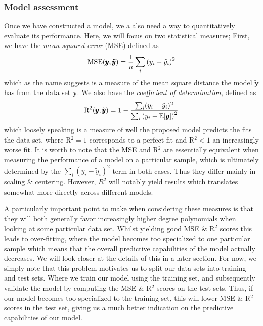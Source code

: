 \documentclass[reprint, english, nofootinbib]{revtex4-2}
\begin{document}
        \subsubsection{Model assessment}
            \noindent
            Once we have constructed a model, we a also need a way to quantitatively evaluate its performance. Here, we will focus on two statistical measures; First, we have the \textit{mean squared error} (MSE) defined as
            \begin{equation}
                \textup{MSE}(\pmb y, \pmb{\tilde y}) = \frac{1}{n}\sum_i \qty(y_i - \tilde y_i)^2
            \end{equation}
            which as the name suggests is a measure of the mean square distance the model $\pmb{\tilde y}$ has from the data set $\pmb y$. We also have the \textit{coefficient of determination}, defined as
            \begin{equation}
                \textup{R}^2(\pmb y, \tilde{\pmb{y}}) = 1 -
                \frac{\sum_i(y_i - \tilde y_i)^2}{\sum_i \qty(y_i - \mathbb E\qty[\pmb y])^2}
            \end{equation}
            which loosely speaking is a measure of well the proposed model predicts the fits the data set, where R$^2 = 1$ corresponds to a perfect fit and R$^2 < 1$ an increasingly worse fit. It is worth to note that the MSE and R$^2$ are essentially equivalent when measuring the performance of a model on a particular sample, which is ultimately determined by the $\sum_i(y_i - \tilde y_i)^2$ term in both cases. Thus they differ mainly in scaling \& centering. However, $R^2$ will notably yield results which translates somewhat more directly across different models.

            A particularly important point to make when considering these measures is that they will both generally favor increasingly higher degree polynomials when looking at some particular data set. Whilst yielding good MSE \& R$^2$ scores this leads to over-fitting, where the model becomes too specialized to one particular sample which means that the overall predictive capabilities of the model actually decreases. We will look closer at the details of this in a later section. For now, we simply note that this problem motivates us to split our data sets into training and test sets. Where we train our model using the training set, and subsequently validate the model by computing the MSE \& R$^2$ scores on the test sets. Thus, if our model becomes too specialized to the training set, this will lower MSE \& R$^2$ scores in the test set, giving us a much better indication on the predictive capabilities of our model.
\end{document}
